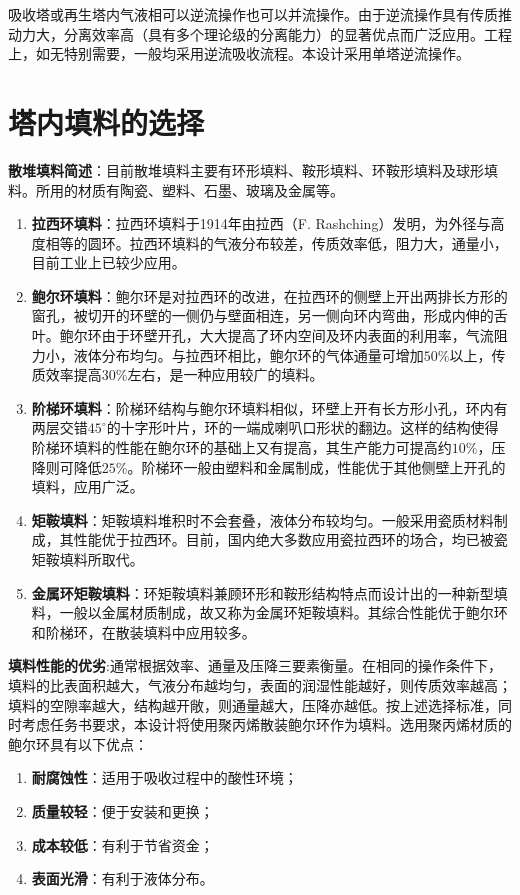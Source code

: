 吸收塔或再生塔内气液相可以逆流操作也可以并流操作。由于逆流操作具有传质推动力大，分离效率高（具有多个理论级的分离能力）的显著优点而广泛应用。工程上，如无特别需要，一般均采用逆流吸收流程。本设计采用单塔逆流操作。



\section{塔内填料的选择}

\textbf{散堆填料简述}：目前散堆填料主要有环形填料、鞍形填料、环鞍形填料及球形填料。所用的材质有陶瓷、塑料、石墨、玻璃及金属等。

\begin{enumerate}
	\item \textbf{拉西环填料}：拉西环填料于1914年由拉西（F. Rashching）发明，为外径与高度相等的圆环。拉西环填料的气液分布较差，传质效率低，阻力大，通量小，目前工业上已较少应用。
	
	\item \textbf{鲍尔环填料}：鲍尔环是对拉西环的改进，在拉西环的侧壁上开出两排长方形的窗孔，被切开的环壁的一侧仍与壁面相连，另一侧向环内弯曲，形成内伸的舌叶。鲍尔环由于环壁开孔，大大提高了环内空间及环内表面的利用率，气流阻力小，液体分布均匀。与拉西环相比，鲍尔环的气体通量可增加$50\%$以上，传质效率提高$30\%$左右，是一种应用较广的填料。
	
	\item \textbf{阶梯环填料}：阶梯环结构与鲍尔环填料相似，环壁上开有长方形小孔，环内有两层交错$45^{\circ}$的十字形叶片，环的一端成喇叭口形状的翻边。这样的结构使得阶梯环填料的性能在鲍尔环的基础上又有提高，其生产能力可提高约$10\%$，压降则可降低$25\%$。阶梯环一般由塑料和金属制成，性能优于其他侧壁上开孔的填料，应用广泛。
	\item \textbf{矩鞍填料}：矩鞍填料堆积时不会套叠，液体分布较均匀。一般采用瓷质材料制成，其性能优于拉西环。目前，国内绝大多数应用瓷拉西环的场合，均已被瓷矩鞍填料所取代。
	
	\item \textbf{金属环矩鞍填料}：环矩鞍填料兼顾环形和鞍形结构特点而设计出的一种新型填料，一般以金属材质制成，故又称为金属环矩鞍填料。其综合性能优于鲍尔环和阶梯环，在散装填料中应用较多。
\end{enumerate}

\textbf{填料性能的优劣}:通常根据效率、通量及压降三要素衡量。在相同的操作条件下，填料的比表面积越大，气液分布越均匀，表面的润湿性能越好，则传质效率越高；填料的空隙率越大，结构越开敞，则通量越大，压降亦越低。按上述选择标准，同时考虑任务书要求，本设计将使用聚丙烯散装鲍尔环作为填料。选用聚丙烯材质的鲍尔环具有以下优点：
\begin{enumerate}
	\item \textbf{耐腐蚀性}：适用于吸收过程中的酸性环境；
	
	\item \textbf{质量较轻}：便于安装和更换；
	
	\item \textbf{成本较低}：有利于节省资金；
	
	\item \textbf{表面光滑}：有利于液体分布。
\end{enumerate}

